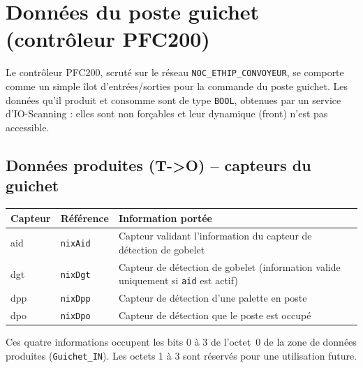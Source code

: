 \section{Données du poste guichet (contrôleur PFC200)}
\label{secDonneesGuichet}

Le contrôleur PFC200, scruté sur le réseau \texttt{NOC\_ETHIP\_CONVOYEUR},
se comporte comme un simple îlot d'entrées/sorties pour la commande du
poste guichet. Les données qu'il produit et consomme sont de type
\texttt{BOOL}, obtenues par un service d'IO-Scanning : elles sont non
forçables et leur dynamique (front) n'est pas accessible.

\subsection{Données produites (T->O) -- capteurs du guichet}

\begin{center}
\begin{tabular}{|l|l|p{7cm}|}
\hline
\textbf{Capteur} & \textbf{Référence} & \textbf{Information portée} \\
\hline
aid & \texttt{nixAid} & Capteur validant l'information du capteur de
détection de gobelet \\
\hline
dgt & \texttt{nixDgt} & Capteur de détection de gobelet (information valide
uniquement si \texttt{aid} est actif) \\
\hline
dpp & \texttt{nixDpp} & Capteur de détection d'une palette en poste \\
\hline
dpo & \texttt{nixDpo} & Capteur de détection que le poste est occupé \\
\hline
\end{tabular}
\end{center}


Ces quatre informations occupent les bits 0 à 3 de l'octet~0 de la zone de
données produites (\texttt{Guichet\_IN}). Les octets 1 à 3 sont réservés
pour une utilisation future.


